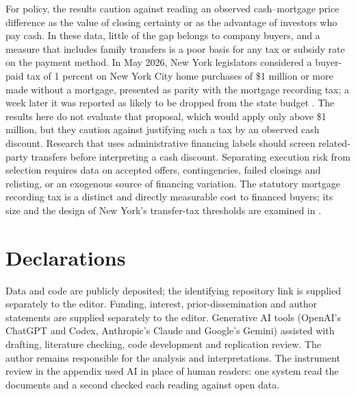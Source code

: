 \documentclass[12pt]{article}
\begin{document}
For policy, the results caution against reading an observed cash--mortgage price difference as the value of closing certainty or as the advantage of investors who pay cash. In these data, little of the gap belongs to company buyers, and a measure that includes family transfers is a poor basis for any tax or subsidy rate on the payment method. In May 2026, New York legislators considered a buyer-paid tax of 1 percent on New York City home purchases of \$1 million or more made without a mortgage, presented as parity with the mortgage recording tax; a week later it was reported as likely to be dropped from the state budget \citep{bloomberg2026cashtax,bloomberg2026cashtaxdropped}. The results here do not evaluate that proposal, which would apply only above \$1 million, but they caution against justifying such a tax by an observed cash discount. Research that uses administrative financing labels should screen related-party transfers before interpreting a cash discount. Separating execution risk from selection requires data on accepted offers, contingencies, failed closings and relisting, or an exogenous source of financing variation. The statutory mortgage recording tax is a distinct and directly measurable cost to financed buyers; its size and the design of New York's transfer-tax thresholds are examined in \citet{loschi2026shape}.

\section*{Declarations}\begingroup\small\singlespacing
Data and code are publicly deposited; the identifying repository link is supplied separately to the editor. Funding, interest, prior-dissemination and author statements are supplied separately to the editor. Generative AI tools (OpenAI's ChatGPT and Codex, Anthropic's Claude and Google's Gemini) assisted with drafting, literature checking, code development and replication review. The author remains responsible for the analysis and interpretations. The instrument review in the appendix used AI in place of human readers: one system read the documents and a second checked each reading against open data.
\par\endgroup\clearpage\appendix
\end{document}
